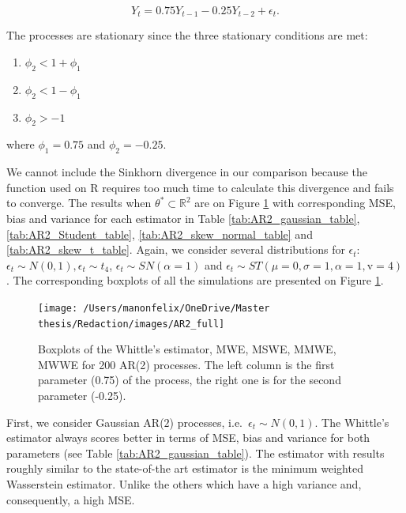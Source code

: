\documentclass[
  11pt,
]{article}
\providecommand{\tightlist}{%
  \setlength{\itemsep}{0pt}\setlength{\parskip}{0pt}}
\begin{document}
\[Y_t = 0.75 Y_{t-1} - 0.25Y_{t-2} + \epsilon_t.\]

The processes are stationary since the three stationary conditions are
met:

\begin{enumerate}
\def\labelenumi{\arabic{enumi}.}
\tightlist
\item
  \(\phi_{2}<1+\phi_{1}\)
\item
  \(\phi_{2}<1-\phi_{1}\)
\item
  \(\phi_{2}>-1\)
\end{enumerate}

where \(\phi_1 = 0.75\) and \(\phi_2 = -0.25\).

We cannot include the Sinkhorn divergence in our comparison because the
function used on R requires too much time to calculate this divergence
and fails to converge. The results when
\(\theta^* \subset \mathbb{R}^2\) are on Figure \ref{fig:ar2_full} with
corresponding MSE, bias and variance for each estimator in Table
\ref{tab:AR2_gaussian_table}, \ref{tab:AR2_Student_table},
\ref{tab:AR2_skew_normal_table} and \ref{tab:AR2_skew_t_table}. Again,
we consider several distributions for \(\epsilon_t\):
\(\epsilon_t \sim N(0,1), \epsilon_t \sim t_4\),
\(\epsilon_t \sim SN(\alpha = 1)\) and
\(\epsilon_t \sim S T(\mu = 0, \sigma = 1, \alpha = 1, \mathrm{v} = 4)\).
The corresponding boxplots of all the simulations are presented on
Figure \ref{fig:ar2_full}.

\begin{figure}

{\centering \texttt{[image: /Users/manonfelix/OneDrive/Master thesis/Redaction/images/AR2\_full]} 

}

\caption{Boxplots of the Whittle's estimator, MWE, MSWE, MMWE, MWWE for 200 AR(2) processes. The left column is the first parameter (0.75) of the process, the right one is for the second parameter (-0.25).}\label{fig:ar2_full}
\end{figure}

First, we consider Gaussian AR(\(2\)) processes,
i.e.~\(\epsilon_t \sim N(0,1)\). The Whittle's estimator always scores
better in terms of MSE, bias and variance for both parameters (see Table
\ref{tab:AR2_gaussian_table}). The estimator with results roughly
similar to the state-of-the art estimator is the minimum weighted
Wasserstein estimator. Unlike the others which have a high variance and,
consequently, a high MSE.
\end{document}
